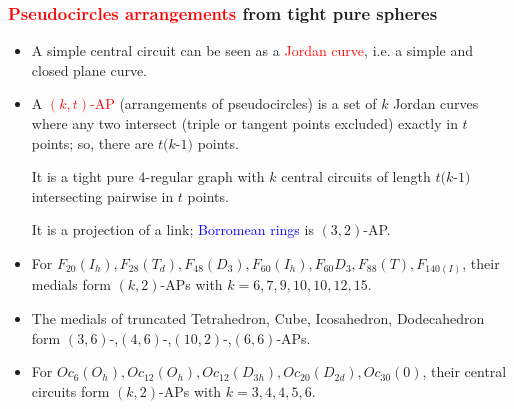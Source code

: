 \documentclass{beamer}
\begin{document}
\begin{frame}\frametitle{
\textcolor{red}{Pseudocircles arrangements} from tight 
pure spheres}
\vspace{-2mm}
\begin{itemize}
\item
A simple  central circuit can be seen as a \textcolor{red}{Jordan 
curve}, i.e. a 
simple and closed plane 
curve.
\item
A \textcolor{red}{$(k,t)$-AP} 
(arrangements of pseudocircles) is 
a set of $k$ Jordan curves where any two intersect (triple or tangent points 
excluded) exactly in $t$ points; so, there are $t(k$-$1)$ 
points. 

It is a tight pure $4$-regular graph with $k$ central circuits of length 
$t(k$-$1)$ intersecting pairwise in $t$ points. 

It is a projection of  
a link; \textcolor{blue}{Borromean rings} is  $(3,2)$-AP.

\item 
For $F_{20}(I_h),F_{28}(T_d), 
F_{48}(D_3),F_{60}(I_h),F_{60}{D_3},F_{88}(T),F_{140(I)}$, their medials  
form 
$(k,2)$-APs with 
$k=6,7,9,10,10, 
12,15$. 

 \item The medials of truncated 
Tetrahedron, Cube, Icosahedron, Dodecahedron  
 form $(3,6)$-,$(4,6)$-,$(10,2)$-,$(6,6)$-APs.

\item For
$Oc_{6}(O_h),Oc_{12}(O_h),Oc_{12}(D_{3h}),Oc_{20}(D_{2d}),Oc_{30}(0)$, 
their central circuits  form 
$(k,2)$-APs with $k=3,4,4,5,6$.
\end{itemize}
\end{frame}
\end{document}
